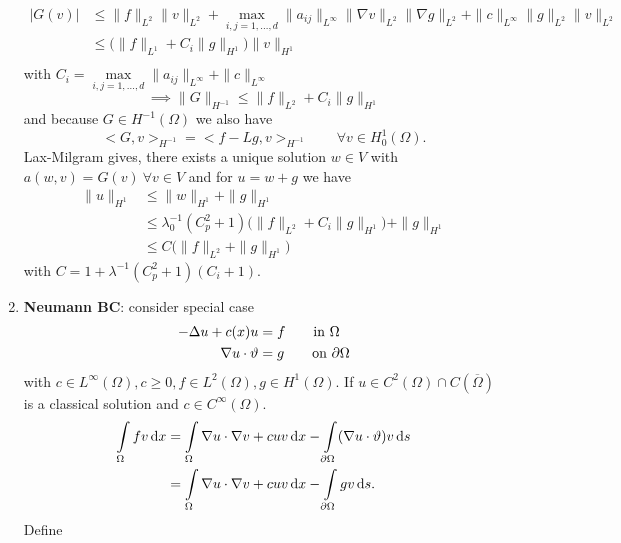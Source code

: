 \begin{enumerate}[=(\alph*)]
\begin{proof_}
\begin{itemize}
\begin{align*}
				|G(v)| & \leq \|f\|_{L^2}\|v\|_{L^2} + \underset{i,j=1, \dots, d}{\max} \|a_{ij}\|_{L^\infty} \|\nabla v\|_{L^2} \|\nabla g\|_{L^2} + \|c\|_{L^\infty}\|g\|_{L^2}\|v\|_{L^2}\\
					   & \leq \big (  \|f\|_{L^1} + C_i\|g\|_{H^1} \big ) \|v\|_{H^1}\\ 
			\end{align*}
			with $C_i =  \underset{i,j=1, \dots, d}{\max} \|a_{ij}\|_{L^\infty} + \|c\|_{L^\infty}$
			\begin{equation*}
				\implies  \|G\|_{H^{-1}} \leq \|f\|_{L^2} +  C_i\|g\|_{H^1}
			\end{equation*}
			and because $G \in H^{-1}(\Omega)$ we also have
			\begin{equation*}
				<G,v>_{H^{-1}} = <f-Lg,v>_{H^{-1}} \qquad \forall v \in H^1_0(\Omega).
			\end{equation*}
			Lax-Milgram gives, there exists a unique solution $w \in V$ with $a(w,v) = G(v)\ \forall v \in V$ and for $u = w+g$ we have
			\begin{align*}
				\|u\|_{H^1} & \leq \|w\|_{H^1} + \|g\|_{H^1}\\
							& \leq \lambda^{-1}_0 \left( C^2_p +1 \right)\big (  \|f\|_{L^2} +  C_i\|g\|_{H^1} \big ) + \|g\|_{H^1}\\
							& \leq C \big ( \|f\|_{L^2} + \|g\|_{H^1} \big ) 
			\end{align*}
			with $C = 1+ \lambda^{-1}(C^2_p+1)(C_i +1)$.
		\end{itemize}
	\end{proof_}
	\item \textbf{Neumann BC}:\enter
	consider special case  
	\begin{align*}
		- \Delta u + c(x)u &= f \qquad \text{in }\Omega\\
		\nabla u \cdot \vartheta &=g \qquad \text{on } \partial\Omega
	\end{align*}
	with $c \in L^\infty(\Omega), c\geq 0, f\in L^2(\Omega), g \in H^1(\Omega)$.
	If $u \in C^2(\Omega)\cap C(\overline{\Omega})$ is a classical solution and $c \in C^\infty(\Omega)$.
	\begin{align*}
		\int \limits_\Omega fv \mathop{}\!\mathrm{d} x &= \int \limits_\Omega \nabla u \cdot  \nabla v + cuv \mathop{}\!\mathrm{d} x - \int \limits_{\partial\Omega} (\nabla u \cdot \vartheta)v \mathop{}\!\mathrm{d} s\\
		&= \int \limits_\Omega \nabla u \cdot  \nabla v + cuv \mathop{}\!\mathrm{d} x - \int \limits_{\partial\Omega} gv \mathop{}\!\mathrm{d} s.
	\end{align*}
	Define 
	\begin{align*}

\end{align*}
\end{enumerate}
